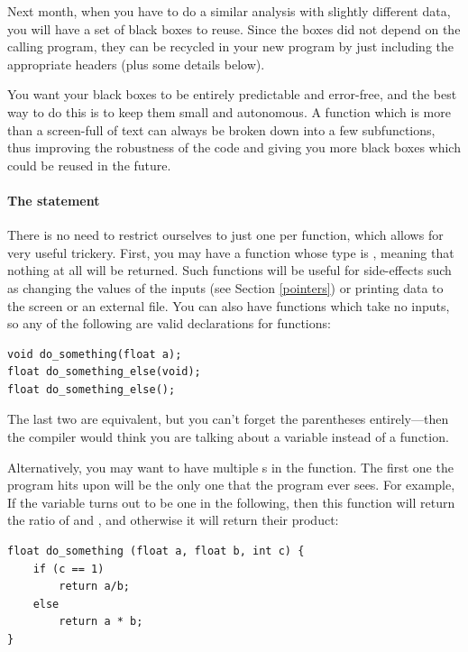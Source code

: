 \documentclass[12pt]{article}
\makeatletter
\def\ttind#1{\index{#1@\cinline{#1}}\cinline{#1}}
\def\ttindex#1{\index{#1@\cinline{#1}}}
\makeatother
\begin{document}
Next month, when you have to do a similar analysis with slightly different
data, you will have a set of black boxes to reuse. Since the boxes did not
depend on the calling program, they can be recycled in your new program
by just including the appropriate headers (plus some details below).

You want your black boxes to be entirely predictable and error-free, and the best
way to do this is to keep them small and autonomous. A function which is more than a
screen-full of text can always be broken down into a few subfunctions,
thus improving the robustness of the code and giving you more black boxes which could be reused in the
future.

\paragraph{The  statement} \ttindex{return} There
is no need to restrict ourselves to just one  per
function, which allows for very useful trickery. First, you may have a
function whose type is \ttind{void}, meaning that nothing at all will be
returned. Such functions will be useful for side-effects such as changing
the values of the inputs (see Section \ref{pointers}) or printing data
to the screen or an external file. You can also have functions which take
no inputs, so any of the following are valid declarations for functions:

\begin{lstlisting}
void do_something(float a);
float do_something_else(void);
float do_something_else();
\end{lstlisting}

The last two are equivalent, but you can't forget the parentheses entirely---then the compiler would
think you are talking about a variable instead of a function.

Alternatively, you may want to have multiple s in the
function. The first one the program hits upon will be the only one that
the program ever sees. For example, If the variable  turns out to
be one in the following, then this function will return the ratio of  and , and otherwise it
will return their product:

\begin{lstlisting}
float do_something (float a, float b, int c) {
    if (c == 1)
        return a/b;
    else
        return a * b;
}
\end{lstlisting}
\end{document}
